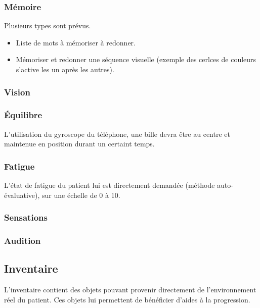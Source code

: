 \documentclass[a4paper,12pt,francais]{article}
\begin{document}
\subsubsection{Mémoire}
Plusieurs types sont prévus.
\begin{itemize}
    \item Liste de mots à mémoriser à redonner.
    \item Mémoriser et redonner une séquence visuelle (exemple des cerlces de couleurs s'active les un après les autres).
\end{itemize}

\subsubsection{Vision}
\subsubsection{Équilibre}
L'utilisation du gyroscope du téléphone, une bille devra être au centre et maintenue en position durant un certaint temps.

\subsubsection{Fatigue}
L’état de fatigue du patient lui est directement demandée (méthode auto-évaluative), sur une échelle de 0 à 10.

\subsubsection{Sensations}
\subsubsection{Audition}
\subsection{Inventaire}
L'inventaire contient des objets pouvant provenir directement de l'environnement réel du patient. Ces objets lui permettent de bénéficier d'aides à la progression.
\end{document}

